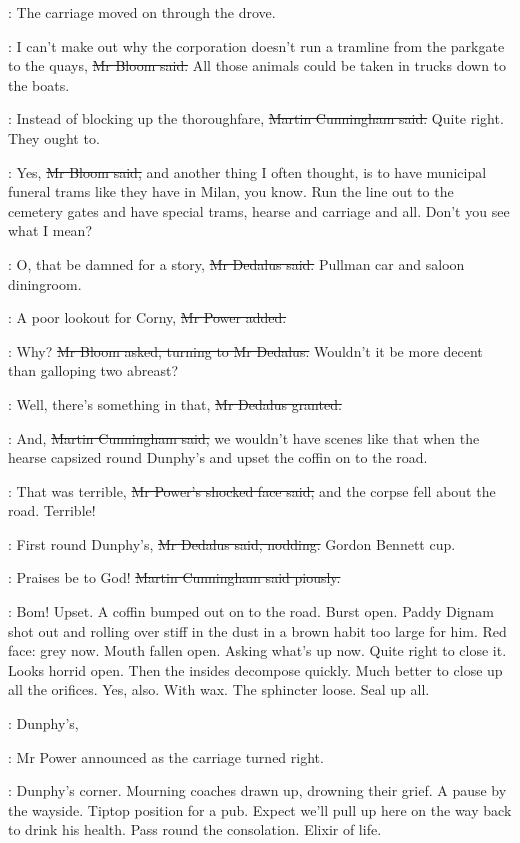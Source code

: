 :
The carriage moved on through the drove.

\Bloom:
I can't make out why the corporation doesn't run a tramline
from the parkgate to the quays,
\sout{Mr Bloom said.}
All those animals could be taken in trucks down to the boats.

\cunningham:
Instead of blocking up the thoroughfare,
\sout{Martin Cunningham said.}
Quite right.
They ought to.

\Bloom:
Yes,
\sout{Mr Bloom said,}
and another thing I often thought,
is to have municipal funeral trams like they have in Milan, you know.
Run the line out to the cemetery gates and have special trams,
hearse and carriage and all.
Don't you see what I mean?

\simon:
O, that be damned for a story,
\sout{Mr Dedalus said.}
Pullman car and saloon diningroom.%

\power:
A poor lookout for Corny,
\sout{Mr Power added.}

\Bloom:
Why?
\sout{Mr Bloom asked, turning to Mr Dedalus.}
Wouldn't it be more decent than galloping two abreast?

\simon:
Well, there's something in that,
\sout{Mr Dedalus granted.}

\cunningham:
And,
\sout{Martin Cunningham said,}
we wouldn't have scenes like that
when the hearse capsized round Dunphy's
and upset the coffin on to the road.

\power:
That was terrible,
\sout{Mr Power's shocked face said,}
and the corpse fell about the road.
Terrible!

\simon:
First round Dunphy's,
\sout{Mr Dedalus said, nodding.}
Gordon Bennett cup.

\cunningham:
Praises be to God!
\sout{Martin Cunningham said piously.}

\BloomInt:
Bom!
Upset.
A coffin bumped out on to the road.
Burst open.
Paddy Dignam shot out and rolling over stiff in the dust
in a brown habit too large for him.
Red face:
grey now.
Mouth fallen open.
Asking what's up now.
Quite right to close it.
Looks horrid open.
Then the insides decompose quickly.
Much better to close up all the orifices.
Yes, also.
With wax.
The sphincter loose.
Seal up all.

\power:
Dunphy's,

:
Mr Power announced
as the carriage turned right.

\BloomInt:
Dunphy's corner.
Mourning coaches drawn up, drowning their grief.
A pause by the wayside.
Tiptop position for a pub.
Expect we'll pull up here on the way back to drink his health.
Pass round the consolation.
Elixir of life.

